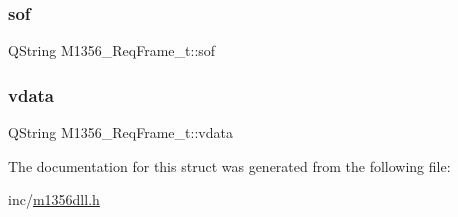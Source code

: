 \subsubsection{\texorpdfstring{sof}{sof}}
{\footnotesize\ttfamily Q\+String M1356\+\_\+\+Req\+Frame\+\_\+t\+::sof}

\mbox{\label{struct_m1356___req_frame__t_afdc84411b144531c4f7270f323fd9e40}} 
\subsubsection{\texorpdfstring{vdata}{vdata}}
{\footnotesize\ttfamily Q\+String M1356\+\_\+\+Req\+Frame\+\_\+t\+::vdata}



The documentation for this struct was generated from the following file\+:\begin{DoxyCompactItemize}
\item 
inc/\mbox{\hyperlink{inc_2m1356dll_8h}{m1356dll.\+h}}\end{DoxyCompactItemize}

